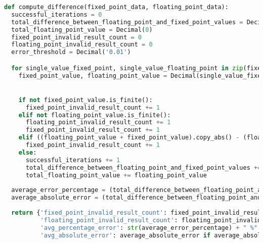 \begin{lstlisting}[language=python,label=lst:validate_new,caption=Validate new]
def compute_difference(fixed_point_data, floating_point_data):
  successful_iterations = 0
  total_difference_between_floating_point_and_fixed_point_values = Decimal(0)
  total_floating_point_value = Decimal(0)
  fixed_point_invalid_result_count = 0
  floating_point_invalid_result_count = 0
  error_threshold = Decimal('0.01')

  for single_value_fixed_point, single_value_floating_point in zip(fixed_point_data, floating_point_data):
    fixed_point_value, floating_point_value = Decimal(single_value_fixed_point), Decimal(single_value_floating_point)


    if not fixed_point_value.is_finite():
      fixed_point_invalid_result_count += 1
    elif not floating_point_value.is_finite():
      floating_point_invalid_result_count += 1
      fixed_point_invalid_result_count += 1
    elif ((floating_point_value + fixed_point_value).copy_abs() - (floating_point_value.copy_abs() + fixed_point_value.copy_abs())) > error_threshold:
      fixed_point_invalid_result_count += 1
    else:
      successful_iterations += 1
      total_difference_between_floating_point_and_fixed_point_values += (floating_point_value - fixed_point_value).copy_abs()
      total_floating_point_value += floating_point_value
      
  average_error_percentage = (total_difference_between_floating_point_and_fixed_point_values / total_floating_point_value * 100) if total_floating_point_value != 0 and successful_iterations > 0 else -1
  average_absolute_error = (total_difference_between_floating_point_and_fixed_point_values / successful_iterations) if successful_iterations > 0 else -1
      
  return {'fixed_point_invalid_result_count': fixed_point_invalid_result_count if successful_iterations > 0 else "no successful iterations", \
          'floating_point_invalid_result_count': floating_point_invalid_result_count if successful_iterations > 0 else "no successful iterations",\
          'avg_percentage_error': str(average_error_percentage) + " %" if average_error_percentage != -1 else "no successful iterations",
          'avg_absolute_error': average_absolute_error if average_absolute_error != -1 else "no successful iterations"}
\end{lstlisting} 


